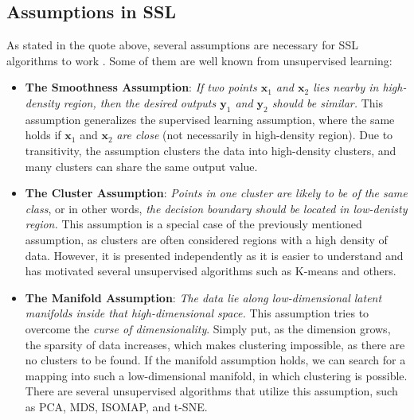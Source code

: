 \subsection{Assumptions in SSL}
As stated in the quote above, several assumptions are necessary for SSL algorithms to work \cite[p. 5]{ssl-book-2006}. 
Some of them are well known from unsupervised learning:
\begin{itemize}
    \item \textbf{The Smoothness Assumption}: \textit{If two points $\mathbf{x}_1$ and $\mathbf{x}_2$ lies nearby in high-density region, 
    then the desired outputs $\mathbf{y}_1$ and $\mathbf{y}_2$ should be similar.} This assumption generalizes the supervised learning assumption,
    where the same holds if $\mathbf{x}_1$ and $\mathbf{x}_2$ \textit{are close} (not necessarily in high-density region). Due to transitivity, 
    the assumption clusters the data into high-density clusters, and many clusters can share the same output value.
    \item \textbf{The Cluster Assumption}: \textit{Points in one cluster are likely to be of the same class}, or in other words, \textit{the decision 
    boundary should be located in low-denisty region.} This assumption is a special case of the previously mentioned assumption, as clusters are often 
    considered regions with a high density of data. However, it is presented independently as it is easier to understand and has motivated several 
    unsupervised algorithms such as K-means and others. %
    \item \textbf{The Manifold Assumption}: \textit{The data lie along low-dimensional latent manifolds inside that high-dimensional space.} This
    assumption tries to overcome the \textit{curse of dimensionality}. Simply put, as the dimension grows, the sparsity of data increases, which makes 
    clustering impossible, as there are no clusters to be found. If the manifold assumption holds, we can search for a mapping into such a 
    low-dimensional manifold, in which clustering is possible. There are several unsupervised algorithms that utilize this assumption, such as PCA, 
    MDS, ISOMAP, and t-SNE.
\end{itemize}



